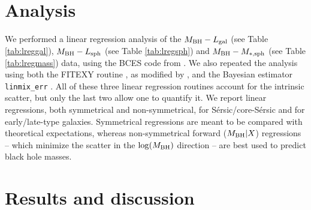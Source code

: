 \documentclass[preprint2]{emulateapj}
\begin{document}


\section{Analysis}
\label{sec:anal}
We performed a linear regression analysis of the $M_{\rm BH} - L_{\rm gal}$ (see Table \ref{tab:lreggal}), 
$M_{\rm BH} - L_{\rm sph}$ (see Table \ref{tab:lregsph}) and $M_{\rm BH} - M_{\rm *,sph}$ (see Table \ref{tab:lregmass}) data,
using the BCES code from \cite{akritasbershady1996}. 
We also repeated the analysis using both the FITEXY routine \citep{press1992}, as modified by \cite{tremaine2002}, 
and the Bayesian estimator {\tt linmix\_err} \citep{linmixerr}. 
All of these three linear regression routines account for the intrinsic scatter, 
but only the last two allow one to quantify it.
We report linear regressions, both symmetrical and non-symmetrical, 
for S\'ersic/core-S\'ersic and for early/late-type galaxies.
Symmetrical regressions are meant to be compared with theoretical expectations, 
whereas non-symmetrical forward ($M_{\rm BH}|X$) regressions -- 
which minimize the scatter in the $\log(M_{\rm BH})$ direction -- 
are best used to predict black hole masses.

\section{Results and discussion}
\label{sec:res}
\end{document}
